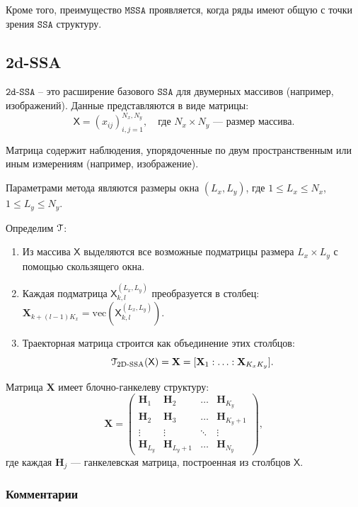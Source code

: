 \documentclass[12pt, specialist, subf
]{disser}
\theoremstyle{definition}
\newcommand{\SSA}{\texttt{SSA}}
\newcommand{\MSSA}{\texttt{MSSA}}
\newcommand{\DSSA}{\texttt{2d-SSA}}
\newcommand{\TS}{\mathsf{X}}
\newcommand{\EMB}{\EuScript{T}}
\begin{document}
Кроме того, преимущество $\MSSA$ проявляется, когда ряды имеют общую с точки зрения $\SSA$ структуру.



\subsection{2d-SSA}

$\DSSA$ -- это расширение базового $\SSA$ для двумерных массивов \cite{ssa_with_R} (например, изображений). Данные представляются в виде матрицы:
\[
	\TS = (x_{ij})_{i,j=1}^{N_x, N_y}, \quad \text{где } N_x \times N_y \text{ — размер массива.}
\]

Матрица содержит наблюдения, упорядоченные по двум пространственным или иным измерениям (например, изображение).

Параметрами метода являются размеры {окна} $(L_x, L_y)$, где $1 \leq L_x \leq N_x$, $1 \leq L_y \leq N_y$.

Определим $\EMB$:

\begin{enumerate}
	\item Из массива $\TS$ выделяются {все возможные подматрицы} размера $L_x \times L_y$ с помощью скользящего окна.
	\item Каждая подматрица $\TS_{k,l}^{(L_x, L_y)}$ преобразуется в столбец: $\mathbf{X}_{k+(l-1)K_x} = \text{vec}(\TS_{k,l}^{(L_x, L_y)})$.
	\item Траекторная матрица строится как объединение этих столбцов:
	      \[
		      \EuScript{T}_{\text{2D-SSA}}(\TS) = \mathbf{X} = [\mathbf{X}_1 : \ldots : \mathbf{X}_{K_x K_y}].
	      \]
\end{enumerate}

Матрица $\mathbf{X}$ имеет {блочно-ганкелеву структуру}:
\[
	\mathbf{X} =
	\begin{pmatrix}
		\mathbf{H}_1     & \mathbf{H}_2       & \ldots & \mathbf{H}_{K_y}   \\
		\mathbf{H}_2     & \mathbf{H}_3       & \ldots & \mathbf{H}_{K_y+1} \\
		\vdots           & \vdots             & \ddots & \vdots             \\
		\mathbf{H}_{L_y} & \mathbf{H}_{L_y+1} & \ldots & \mathbf{H}_{N_y}
	\end{pmatrix},
\]
где каждая $\mathbf{H}_j$ — ганкелевская матрица, построенная из столбцов $\TS$.

\subsubsection{Комментарии}
\end{document}
